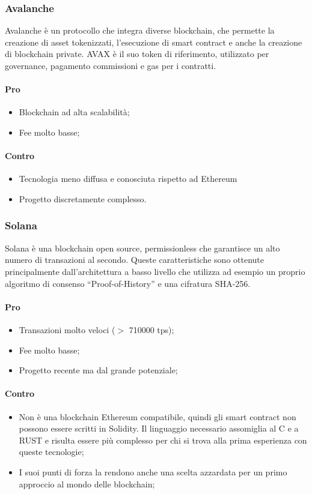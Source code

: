     \subsubsection{Avalanche}
    Avalanche è un protocollo che integra diverse blockchain, che permette la creazione di asset tokenizzati, l'esecuzione di smart contract e anche la creazione di blockchain private. 
    AVAX è il suo token di riferimento, utilizzato per governance, pagamento commissioni e gas per i contratti.
    \paragraph{Pro}
    \begin{itemize}
        \item Blockchain ad alta scalabilità;
        \item Fee molto basse;
    \end{itemize}
    \paragraph{Contro}
    \begin{itemize}
        \item Tecnologia meno diffusa e conosciuta rispetto ad Ethereum
        \item Progetto discretamente complesso.
    \end{itemize}
    
    \subsubsection{Solana}
    Solana è una blockchain open source, permissionless che garantisce un alto numero di transazioni al secondo. Queste caratteristiche sono ottenute principalmente dall’architettura a basso livello
    che utilizza ad esempio un proprio algoritmo di consenso “Proof-of-History” e una cifratura SHA-256.
    \paragraph{Pro}
    \begin{itemize}
        \item Transazioni molto veloci ($>$ 710000 tps);
        \item Fee molto basse;
        \item Progetto recente ma dal grande potenziale;
    \end{itemize}
    \paragraph{Contro}
    \begin{itemize}
        \item Non è una blockchain Ethereum compatibile, quindi gli smart contract non possono essere scritti in Solidity. Il linguaggio necessario assomiglia al C e a RUST e risulta essere più complesso per chi si trova alla prima esperienza con queste tecnologie;
        \item I suoi punti di forza la rendono anche una scelta azzardata per un primo approccio al mondo delle blockchain;
    \end{itemize}
    
